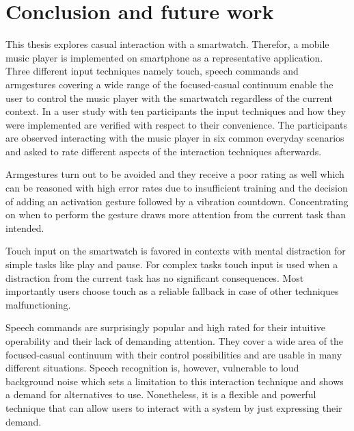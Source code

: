 \chapter{Conclusion and future work}\label{ch:conclusion}

This thesis explores casual interaction with a smartwatch. Therefor, a mobile music player is implemented on smartphone as a representative application. Three different input techniques namely touch, speech commands and armgestures covering a wide range of the focused-casual continuum enable the user to control the music player with the smartwatch regardless of the current context. In a user study with ten participants the input techniques and how they were implemented are verified with respect to their convenience. The participants are observed interacting with the music player in six common everyday scenarios and asked to rate different aspects of the interaction techniques afterwards.

Armgestures turn out to be avoided and they receive a poor rating as well which can be reasoned with high error rates due to insufficient training and the decision of adding an activation gesture followed by a vibration countdown. Concentrating on when to perform the gesture draws more attention from the current task than intended.

Touch input on the smartwatch is favored in contexts with mental distraction for simple tasks like play and pause. For complex tasks touch input is used when a distraction from the current task has no significant consequences. Most importantly users choose touch as a reliable fallback in case of other techniques malfunctioning. 

Speech commands are surprisingly popular and high rated for their intuitive operability and their lack of demanding attention. They cover a wide area of the focused-casual continuum with their control possibilities and are usable in many different situations. Speech recognition is, however, vulnerable to loud background noise which sets a limitation to this interaction technique and shows a demand for alternatives to use. Nonetheless, it is a flexible and powerful technique that can allow users to interact with a system by just expressing their demand.


